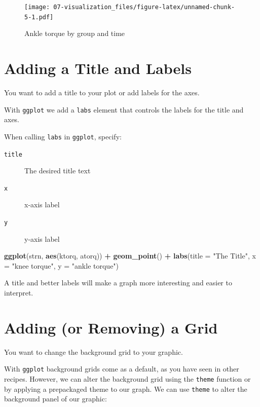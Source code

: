\documentclass[
]{book}
\newenvironment{Shaded}{\begin{snugshade}}{\end{snugshade}}
\newcommand{\DataTypeTok}[1]{\textcolor[rgb]{0.13,0.29,0.53}{#1}}
\newcommand{\KeywordTok}[1]{\textcolor[rgb]{0.13,0.29,0.53}{\textbf{#1}}}
\newcommand{\NormalTok}[1]{#1}
\newcommand{\OperatorTok}[1]{\textcolor[rgb]{0.81,0.36,0.00}{\textbf{#1}}}
\newcommand{\StringTok}[1]{\textcolor[rgb]{0.31,0.60,0.02}{#1}}
\begin{document}
\begin{figure}
\centering
\texttt{[image: 07-visualization\_files/figure-latex/unnamed-chunk-5-1.pdf]}
\caption{\label{fig:unnamed-chunk-5}Ankle torque by group and time}
\end{figure}

\hypertarget{adding-a-title-and-labels}{%
\section{Adding a Title and Labels}\label{adding-a-title-and-labels}}

You want to add a title to your plot or add labels for the axes.

With \texttt{ggplot} we add a \texttt{labs} element that controls the labels for the title and axes.

When calling \texttt{labs} in \texttt{ggplot}, specify:

\begin{description}
\item[\texttt{title}]
The desired title text
\item[\texttt{x}]
x-axis label
\item[\texttt{y}]
y-axis label
\end{description}

\begin{Shaded}
\begin{Highlighting}[]
\KeywordTok{ggplot}\NormalTok{(strn, }\KeywordTok{aes}\NormalTok{(ktorq, atorq)) }\OperatorTok{+}
\StringTok{  }\KeywordTok{geom_point}\NormalTok{() }\OperatorTok{+}
\StringTok{  }\KeywordTok{labs}\NormalTok{(}\DataTypeTok{title =} \StringTok{"The Title"}\NormalTok{,}
       \DataTypeTok{x =} \StringTok{"knee torque"}\NormalTok{,}
       \DataTypeTok{y =} \StringTok{"ankle torque"}\NormalTok{)}
\end{Highlighting}
\end{Shaded}

A title and better labels will make a graph more interesting and easier to interpret.

\hypertarget{adding-or-removing-a-grid}{%
\section{Adding (or Removing) a Grid}\label{adding-or-removing-a-grid}}

You want to change the background grid to your graphic.

With \texttt{ggplot} background grids come as a default, as you have seen in other recipes. However, we can alter the background grid using the \texttt{theme} function or by applying a prepackaged theme to our graph.
We can use \texttt{theme} to alter the background panel of our graphic:
\end{document}
